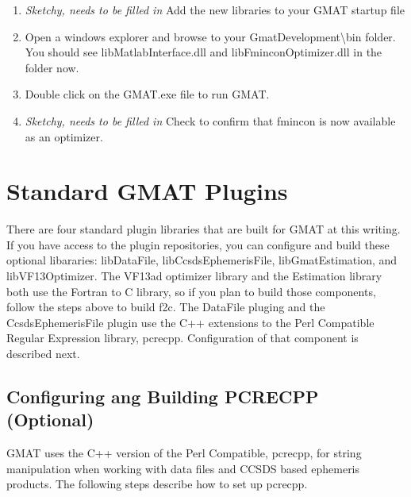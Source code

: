 \documentclass[letterpaper,10pt]{article}%
\begin{document}
\begin{enumerate}
\item \textit{Sketchy, needs to be filled in} Add the new libraries to your GMAT startup file
\item Open a windows explorer and browse to your GmatDevelopment\textbackslash bin folder.  You should see libMatlabInterface.dll and libFminconOptimizer.dll in the folder now.
\item Double click on the GMAT.exe file to run GMAT.
\item \textit{Sketchy, needs to be filled in} Check to confirm that fmincon is now available as an optimizer.
\end{enumerate}


\section{\label{sec:Plugins}Standard GMAT Plugins}

There are four standard plugin libraries that are built for GMAT at this writing.  If you have access to the plugin repositories, you can configure and build these optional libararies: libDataFile, libCcsdsEphemerisFile, libGmatEstimation, and libVF13Optimizer.  The VF13ad optimizer library and the Estimation library both use the Fortran to C library, so if you plan to build those components, follow the steps above to build f2c.  The DataFile pluging and the CcsdsEphemerisFile plugin use the C++ extensions to the Perl Compatible Regular Expression library, pcrecpp.  Configuration of that component is described next.

\subsection{Configuring ang Building PCRECPP (Optional)}

GMAT uses the C++ version of the Perl Compatible, pcrecpp, for string manipulation when working with data files and CCSDS based ephemeris products.  The following steps describe how to set up pcrecpp.
\end{document}
